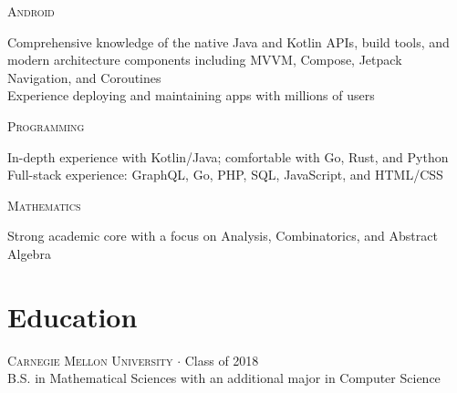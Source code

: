 \documentclass[letterpaper,10pt]{article}
\newenvironment{lcol}
{
    \begin{minipage}[t]{.185\linewidth}
    \begin{flushright}
}
{
    \end{flushright}
    \end{minipage}
}
\newenvironment{rcol}
{
    \begin{minipage}[t]{.8\linewidth}
}
{
    \end{minipage}
}
\begin{document}
\begin{lcol}
    \textsc{ Android}
\end{lcol}
\begin{rcol}
    Comprehensive knowledge of the native Java and Kotlin APIs, build tools, and modern architecture components including MVVM, Compose, Jetpack Navigation, and Coroutines\vspace{4pt} \\
    Experience deploying and maintaining apps with millions of users
\end{rcol}

\vspace{6pt}

\begin{lcol}
    \textsc{Programming}
\end{lcol}
\begin{rcol}
    In-depth experience with Kotlin/Java; comfortable with Go, Rust, and Python
    \vspace{4pt} \\
    Full-stack experience: GraphQL, Go, PHP, SQL, JavaScript, and HTML/CSS
\end{rcol}

\vspace{6pt}

\begin{lcol}
    \textsc{Mathematics}
\end{lcol}
\begin{rcol}
    Strong academic core with a focus on Analysis, Combinatorics, and Abstract Algebra
\end{rcol}

\section{Education}

\textsc{Carnegie Mellon University} $\cdot$ Class of 2018 \\
\-\hspace{.28in} B.S. in Mathematical Sciences with an additional major in Computer Science
\end{document}
